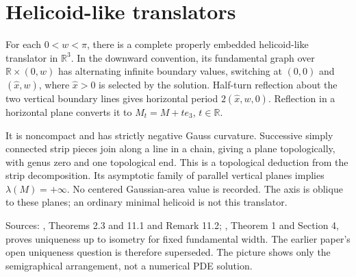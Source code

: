 \chapter{Helicoid-like translators}\label{sec:catalogue-translating-helicoids}
\begin{example}\label{ex:catalogue-translating-helicoids}
For each $0<w<\pi$, there is a complete properly embedded helicoid-like translator in $\mathbb R^3$. In the downward convention, its fundamental graph over $\mathbb R\times(0,w)$ has alternating infinite boundary values, switching at $(0,0)$ and $(\widehat x,w)$, where $\widehat x>0$ is selected by the solution. Half-turn reflection about the two vertical boundary lines gives horizontal period $2(\widehat x,w,0)$. Reflection in a horizontal plane converts it to $M_t=M+te_3$, $t\in\mathbb R$.

It is noncompact and has strictly negative Gauss curvature. Successive simply connected strip pieces join along a line in a chain, giving a plane topologically, with genus zero and one topological end. This is a topological deduction from the strip decomposition. Its asymptotic family of parallel vertical planes implies $\lambda(M)=+\infty$. No centered Gaussian-area value is recorded. The axis is oblique to these planes; an ordinary minimal helicoid is not this translator.

Sources: \cite{CatHMW20}, Theorems 2.3 and 11.1 and Remark 11.2; \cite{CatMSTW26}, Theorem 1 and Section 4, proves uniqueness up to isometry for fixed fundamental width. The earlier paper's open uniqueness question is therefore superseded. The picture shows only the semigraphical arrangement, not a numerical PDE solution.
\end{example}

